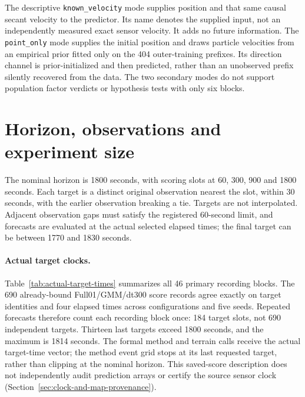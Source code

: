 The descriptive \texttt{known\_velocity} mode supplies position and that same
causal secant velocity to the predictor. Its name denotes the supplied input,
not an independently measured exact sensor velocity. It adds no future
information. The \texttt{point\_only} mode supplies the initial position and
draws particle velocities from an empirical prior fitted only on the 404
outer-training prefixes. Its direction channel is prior-initialized and then
predicted, rather than an unobserved prefix silently recovered from the data.
The two secondary modes do not support population factor verdicts or
hypothesis tests with only six blocks.


\section{Horizon, observations and experiment size}
\label{sec:inventory}\hypertarget{sec:inventory}{}
The nominal horizon is 1800 seconds, with scoring slots at 60, 300, 900 and
1800 seconds. Each target is a distinct original observation nearest the
slot, within 30 seconds, with the earlier observation breaking a tie.
Targets are not interpolated. Adjacent observation gaps must satisfy the
registered 60-second limit, and forecasts are evaluated at the actual selected
elapsed times; the final target can be between 1770 and 1830 seconds.

\paragraph{Actual target clocks.}\label{sec:target-times}\hypertarget{sec:target-times}{}
Table~\ref{tab:actual-target-times} summarizes all 46 primary recording blocks.
The 690 already-bound Full01/GMM/dt300 score records agree exactly on target
identities and four elapsed times across configurations and five seeds.
Repeated forecasts therefore count each recording block once: 184 target
slots, not 690 independent targets. Thirteen last targets exceed 1800 seconds,
and the maximum is 1814 seconds. The formal method and terrain calls receive
the actual target-time vector; the method event grid stops at its last
requested target, rather than clipping at the nominal horizon.
This saved-score description does not independently audit prediction arrays
or certify the source sensor clock (Section~\ref{sec:clock-and-map-provenance}).

